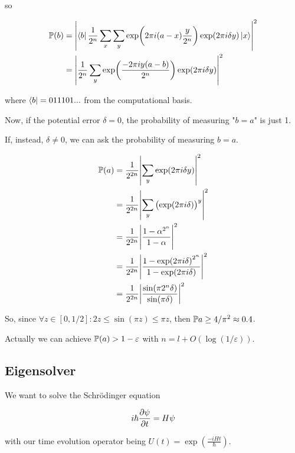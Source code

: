 \documentclass[main.tex]{subfiles}
\begin{document}
so

\begin{subequations}
\begin{align}
  \P(b) &= \abs{\bra{b}  \frac{1}{2^n} \sum _{x} \sum _{y}  \exp(2 \pi i (a-x) \frac{y}{2^n}) \exp(2 \pi i \delta y ) \ket{x} }^2  \\
  &= \abs{\frac{1}{2^n} \sum _{y}  \exp(\frac{-2 \pi i y (a-b)}{2^n}) \exp(2 \pi i \delta y)   }^2
\end{align}
\end{subequations}

where \(\bra{b} = 011101...\) from the computational basis.

Now, if the potential error \(\delta =0\), the probability of measuring "\(b=a\)" is just 1.

If, instead, \(\delta \neq 0\), we can ask the probability of measuring \(b=a\).

\begin{subequations}
\begin{align}
  \P(a) &= \frac{1}{2^{2n}} \abs{\sum _{y}  \exp(2 \pi i \delta y)}^2  \\
  &= \frac{1}{2^{2n}} \abs{\sum _{y} \qty(\exp(2 \pi i \delta))^y }^2  \\
  &= \frac{1}{2^{2n}} \abs{\frac{1-\alpha^{2^n}}{1-\alpha}}^2  \\
  &= \frac{1}{2^{2n}} \abs{\frac{1-\exp(2 \pi i \delta)^{2^n}}{1-\exp(2 \pi i \delta)}}^2  \\
  &= \frac{1}{2^{2n}} \abs{ \frac{\sin(\pi 2^n \delta)}{\sin(\pi \delta)}}^2
\end{align}
\end{subequations}

So, since \(\forall z \in [0, 1/2]: 2z \leq \sin(\pi z) \leq \pi z\), then \(\P {a} \geq 4/ \pi^2 \approx 0.4\).

Actually we can achieve \(\P(a) > 1-\varepsilon\) with \(n = l + O(\log(1/\varepsilon))\).

\subsection{Eigensolver}

We want to solve the Schrödinger equation

\begin{equation}
  i \hbar \pdv{\psi}{t} = H \psi
\end{equation}

with our time evolution operator being \(U(t) = \exp(\frac{-i H t}{\hbar} ) \).
\end{document}
